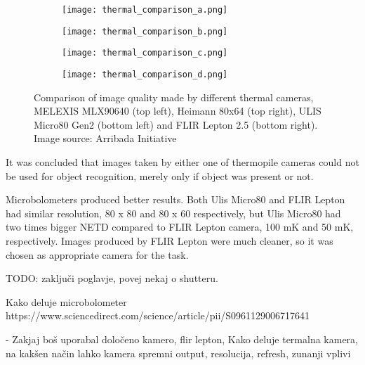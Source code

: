 \begin{figure}[h]
    \begin{subfigure}{0.5\textwidth}
        \centering
        \texttt{[image: thermal\_comparison\_a.png]} 
        \label{thermal_comparison_a}
    \end{subfigure}
    \begin{subfigure}{0.5\textwidth}
        \centering
        \texttt{[image: thermal\_comparison\_b.png]} 
        \label{thermal_comparison_b}
    \end{subfigure}
    \begin{subfigure}{0.5\textwidth}
        \centering
        \texttt{[image: thermal\_comparison\_c.png]} 
        \label{thermal_comparison_c}
    \end{subfigure}
    \begin{subfigure}{0.5\textwidth}
        \centering
        \texttt{[image: thermal\_comparison\_d.png]} 
        \label{thermal_comparison_d}
    \end{subfigure}

\caption{Comparison of image quality made by different thermal cameras, MELEXIS MLX90640 (top left), Heimann 80x64 (top right), ULIS Micro80 Gen2 (bottom left) and FLIR Lepton 2.5 (bottom right). Image source: Arribada Initiative \cite{thermal_comparison}}
    \label{thermal_comparison_images}
\end{figure}

It was concluded that images taken by either one of thermopile cameras could not be used for object recognition, merely only if object was present or not\cite{thermal_comparison}.

Microbolometers produced better results.
Both Ulis Micro80 and FLIR Lepton had similar resolution, 80 x 80 and 80 x 60 respectively, but Ulis Micro80 had two times bigger NETD compared to FLIR Lepton camera, 100 \si{\milli\kelvin} and 50 \si{\milli\kelvin}, respectively.
Images produced by FLIR Lepton were much cleaner, so it was chosen as appropriate camera for the task.

TODO: zaključi poglavje, povej nekaj o shutteru.







Kako deluje microbolometer
https://www.sciencedirect.com/science/article/pii/S0961129006717641

    - Zakjaj boš uporabal določeno kamero, flir lepton, Kako deluje termalna kamera, na kakšen način lahko kamera spremni output, resolucija, refresh, zunanji vplivi

